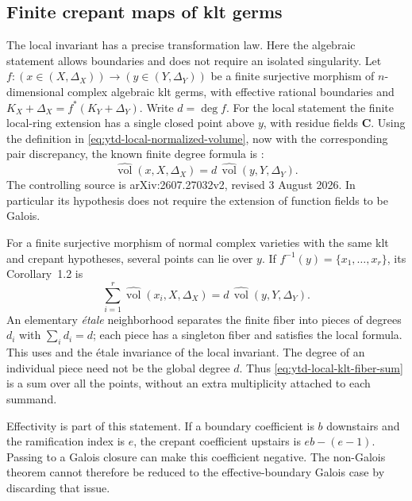\subsection{Finite crepant maps of klt germs}
\label{sec:ytd-local-klt-finite-degree}

The local invariant has a precise transformation law. Here the
algebraic statement allows boundaries and does not require an isolated
singularity. Let
$f:(x\in(X,\Delta_X))\to(y\in(Y,\Delta_Y))$ be a finite
surjective morphism of $n$-dimensional complex algebraic klt germs,
with effective rational boundaries and
$K_X+\Delta_X=f^*(K_Y+\Delta_Y)$. Write $d=\deg f$.
For the local statement the finite local-ring extension has a single
closed point above $y$, with residue fields $\mathbf C$. Using
the definition in \eqref{eq:ytd-local-normalized-volume}, now
with the corresponding pair discrepancy, the known finite degree
formula is
\cite[Theorem~1.1]{Liu26FiniteDegreeV2}:
\[
\tag{68.23bd}\label{eq:ytd-local-klt-finite-degree}
 \widehat{\operatorname{vol}}(x,X,\Delta_X)
       =d\,\widehat{\operatorname{vol}}(y,Y,\Delta_Y).
\]
The controlling source is arXiv:2607.27032v2, revised
3 August 2026. In particular its hypothesis does not require
the extension of function fields to be Galois.

For a finite surjective morphism of normal complex varieties with
the same klt and crepant hypotheses, several points can lie over
$y$. If $f^{-1}(y)=\{x_1,\ldots,x_r\}$, its Corollary~1.2 is
\[
\tag{68.23be}\label{eq:ytd-local-klt-fiber-sum}
 \sum_{i=1}^r\widehat{\operatorname{vol}}(x_i,X,\Delta_X)
       =d\,\widehat{\operatorname{vol}}(y,Y,\Delta_Y).
\]
An elementary \emph{\'etale} neighborhood separates the finite
fiber into pieces of degrees $d_i$ with $\sum_i d_i=d$;
each piece has a singleton fiber and satisfies the local formula.
This uses \cite[Tags~02LN and~05B8]{StacksProject} and the
\'etale invariance of the local invariant. The degree of an
individual piece need not be the global degree $d$. Thus
\eqref{eq:ytd-local-klt-fiber-sum} is a sum over all the
points, without an extra multiplicity attached to each summand.

Effectivity is part of this statement. If a boundary coefficient
is $b$ downstairs and the ramification index is $e$, the crepant
coefficient upstairs is $eb-(e-1)$. Passing to a Galois closure
can make this coefficient negative. The non-Galois theorem cannot
therefore be reduced to the effective-boundary Galois case by
discarding that issue.

